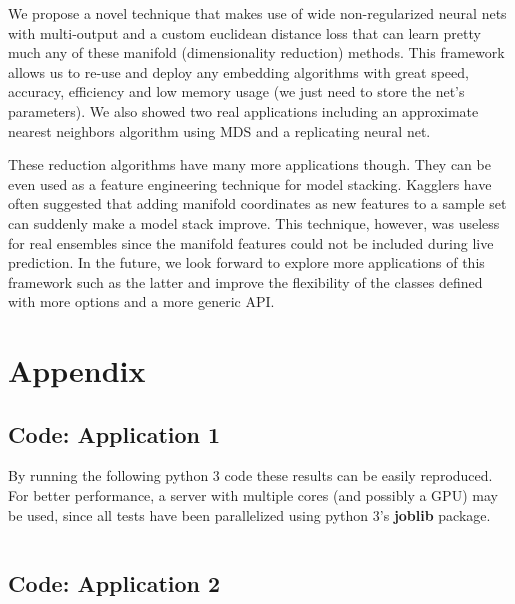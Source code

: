 \documentclass[a4paper,11pt,spanish]{report}
\begin{document}
We propose a novel technique that makes use of wide non-regularized neural nets with multi-output and a custom euclidean distance loss that can learn pretty much any of these manifold (dimensionality reduction) methods. This framework allows us to re-use and deploy any embedding algorithms with great speed, accuracy, efficiency and low memory usage (we just need to store the net's parameters). We also showed two real applications including an approximate nearest neighbors algorithm using MDS and a replicating neural net. 

These reduction algorithms have many more applications though. They can be even used as a feature engineering technique for model stacking. Kagglers have often suggested that adding manifold coordinates as new features to a sample set can suddenly make a model stack improve. This technique, however, was useless for real ensembles since the manifold features could not be included during live prediction. In the future, we look forward to explore more applications of this framework such as the latter and improve the flexibility of the classes defined with more options and a more generic API.


\chapter{Appendix}
\label{chap:appendix}
\nocite{*}

\section{Code: Application 1}
\label{code1}

By running the following python 3 code these results can be easily reproduced. For better performance, a server with multiple cores (and possibly a GPU) may be used, since all tests have been parallelized using python 3's \textbf{joblib} package.

\vspace{10px}
\inputminted[baselinestretch=1, fontsize=\scriptsize, breaklines]{python}{application1.py}
\newpage

\section{Code: Application 2}
\label{code2}

\inputminted[baselinestretch=1, fontsize=\scriptsize, breaklines]{python}{application2.py}
\newpage
\end{document}

